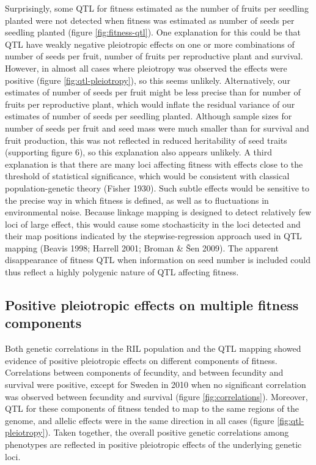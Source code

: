 \documentclass[12pt,]{article}
\begin{document}
Surprisingly, some QTL for fitness estimated as the number of fruits per seedling planted were not detected when fitness was estimated as number of seeds per seedling planted (figure \ref{fig:fitness-qtl}).
One explanation for this could be that QTL have weakly negative pleiotropic effects on one or more combinations of number of seeds per fruit, number of fruits per reproductive plant and survival.
However, in almost all cases where pleiotropy was observed the effects were positive (figure \ref{fig:qtl-pleiotropy}), so this seems unlikely.
Alternatively, our estimates of number of seeds per fruit might be less precise than for number of fruits per reproductive plant, which would inflate the residual variance of our estimates of number of seeds per seedling planted.
Although sample sizes for number of seeds per fruit and seed mass were much smaller than for survival and fruit production, this was not reflected in reduced heritability of seed traits (supporting figure 6), so this explanation also appears unlikely.
A third explanation is that there are many loci affecting fitness with effects close to the threshold of statistical significance, which would be consistent with classical population-genetic theory (Fisher 1930).
Such subtle effects would be sensitive to the precise way in which fitness is defined, as well as to fluctuations in environmental noise.
Because linkage mapping is designed to detect relatively few loci of large effect, this would cause some stochasticity in the loci detected and their map positions indicated by the stepwise-regression approach used in QTL mapping (Beavis 1998; Harrell 2001; Broman \& Šen 2009).
The apparent disappearance of fitness QTL when information on seed number is included could thus reflect a highly polygenic nature of QTL affecting fitness.

\hypertarget{positive-pleiotropic-effects-on-multiple-fitness-components}{%
\subsection{Positive pleiotropic effects on multiple fitness components}\label{positive-pleiotropic-effects-on-multiple-fitness-components}}

Both genetic correlations in the RIL population and the QTL mapping showed evidence of positive pleiotropic effects on different components of fitness.
Correlations between components of fecundity, and between fecundity and survival were positive, except for Sweden in 2010 when no significant correlation was observed between fecundity and survival (figure \ref{fig:correlations}).
Moreover, QTL for these components of fitness tended to map to the same regions of the genome, and allelic effects were in the same direction in all cases (figure \ref{fig:qtl-pleiotropy}).
Taken together, the overall positive genetic correlations among phenotypes are reflected in positive pleiotropic effects of the underlying genetic loci.
\end{document}
